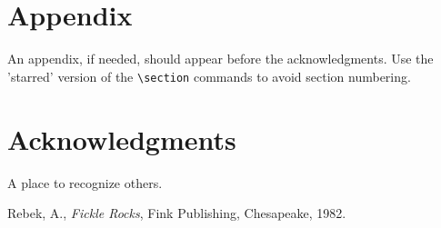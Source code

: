\documentclass[]{aiaa-tc}%
\begin{document}
\section*{Appendix}

An appendix, if needed, should appear before the acknowledgments.
Use the 'starred' version of the \verb|\section| commands to avoid
section numbering.

\section*{Acknowledgments}

A place to recognize others.

\begin{thebibliography}{9}%
 Rebek, A., {\it Fickle Rocks}, Fink Publishing, Chesapeake, 1982.
\end{thebibliography}
\end{document}
